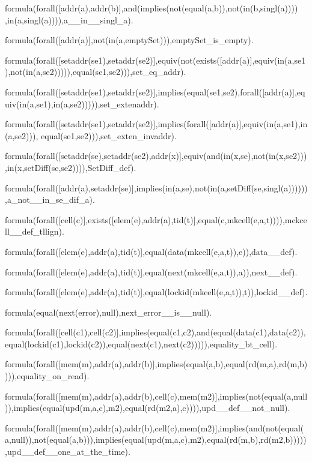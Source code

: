 formula(forall([addr(a),addr(b)],and(implies(not(equal(a,b)),not(in(b,singl(a)))) ,in(a,singl(a)))),a\_\_in\_\_singl\_a).

formula(forall([addr(a)],not(in(a,emptySet))),emptySet\_is\_empty).

formula(forall([setaddr(se1),setaddr(se2)],equiv(not(exists([addr(a)],equiv(in(a,se1),not(in(a,se2))))),equal(se1,se2))),set\_eq\_addr).

formula(forall([setaddr(se1),setaddr(se2)],implies(equal(se1,se2),forall([addr(a)],equiv(in(a,se1),in(a,se2))))),set\_extenaddr).

formula(forall([setaddr(se1),setaddr(se2)],implies(forall([addr(a)],equiv(in(a,se1),in(a,se2))),    equal(se1,se2))),set\_exten\_invaddr).

formula(forall([setaddr(se),setaddr(se2),addr(x)],equiv(and(in(x,se),not(in(x,se2))),in(x,setDiff(se,se2)))),SetDiff\_def).

formula(forall([addr(a),setaddr(se)],implies(in(a,se),not(in(a,setDiff(se,singl(a)))))),a\_not\_\_in\_se\_dif\_a).




formula(forall([cell(c)],exists([elem(e),addr(a),tid(t)],equal(c,mkcell(e,a,t)))),mckcell\_\_def\_tllign).

formula(forall([elem(e),addr(a),tid(t)],equal(data(mkcell(e,a,t)),e)),data\_\_def).

formula(forall([elem(e),addr(a),tid(t)],equal(next(mkcell(e,a,t)),a)),next\_\_def).

formula(forall([elem(e),addr(a),tid(t)],equal(lockid(mkcell(e,a,t)),t)),lockid\_\_def).

formula(equal(next(error),null),next\_error\_\_is\_\_null).

formula(forall([cell(c1),cell(c2)],implies(equal(c1,c2),and(equal(data(c1),data(c2)),equal(lockid(c1),lockid(c2)),equal(next(c1),next(c2))))),equality\_bt\_cell).

formula(forall([mem(m),addr(a),addr(b)],implies(equal(a,b),equal(rd(m,a),rd(m,b)))),equality\_on\_read).



formula(forall([mem(m),addr(a),addr(b),cell(c),mem(m2)],implies(not(equal(a,null)),implies(equal(upd(m,a,c),m2),equal(rd(m2,a),c)))),upd\_\_def\_\_not\_null).

formula(forall([mem(m),addr(a),addr(b),cell(c),mem(m2)],implies(and(not(equal(a,null)),not(equal(a,b))),implies(equal(upd(m,a,c),m2),equal(rd(m,b),rd(m2,b))))),upd\_\_def\_\_one\_at\_the\_time).


